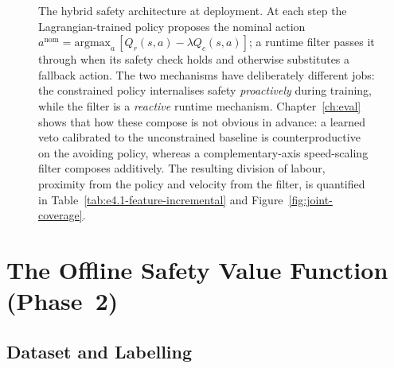 \documentclass[11pt,a4paper]{report}
\begin{document}
\begin{figure}[h]
{%
}
\caption{The hybrid safety architecture at deployment. At each step
the Lagrangian-trained policy proposes the nominal action
$a^{\mathrm{nom}} = \mathrm{argmax}_a\,[Q_r(s,a) - \lambda Q_c(s,a)]$;
a runtime filter passes it through when its safety check holds and
otherwise substitutes a fallback action. The two mechanisms have
deliberately different jobs: the constrained policy internalises
safety \emph{proactively} during training, while the filter is a
\emph{reactive} runtime mechanism. Chapter~\ref{ch:eval} shows that
how these compose is not obvious in advance: a learned veto calibrated
to the unconstrained baseline is counterproductive on the avoiding
policy, whereas a complementary-axis speed-scaling filter composes
additively. The resulting division of labour, proximity from the
policy and velocity from the filter, is quantified in
Table~\ref{tab:e4.1-feature-incremental} and
Figure~\ref{fig:joint-coverage}.}
\label{fig:hybrid-overview}
\end{figure}

\section{The Offline Safety Value Function (Phase~2)}
\label{sec:method:filter}

\subsection{Dataset and Labelling}
\label{sec:method:filter:data}
\end{document}
